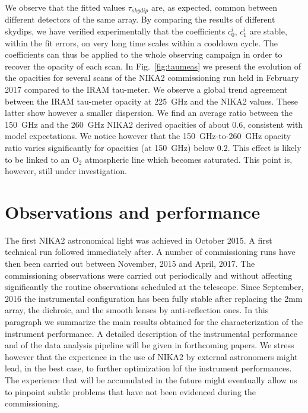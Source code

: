 \documentclass[]{aa} %
\begin{document}
We observe that the fitted values $\tau_{skydip}$ are, as expected, common between different detectors of the same array. By comparing the results of different skydips, we have verified experimentally that the coefficients $c^{i}_0$, $c^{i}_1$ are stable, within the fit errors, on very long time scales within a cooldown cycle. The coefficients can thus be applied to the whole observing campaign in order to recover the opacity of each scan. In Fig.~\ref{fig:taumeas} we present the evolution of the opacities for several scans of the NIKA2 commissioning run held in February 2017 compared to the IRAM tau-meter. We observe a global trend agreement between the IRAM tau-meter opacity at 225~GHz and the NIKA2 values. These latter show however a smaller dispersion. We find an average ratio between the 150~GHz and the 260~GHz NIKA2 derived opacities of about 0.6, consistent with model expectations. We notice however that the 150~GHz-to-260~GHz opacity ratio varies significantly for opacities (at 150~GHz) below $0.2$. This effect is likely to be linked to an O$_2$ atmospheric line which becomes saturated. This point is, however, still under investigation.

\section{Observations and performance}
\label{Observations and performance}

The first NIKA2 astronomical light was achieved in October 2015. A first technical run followed immediately after. A number of commissioning runs have then been carried out between November, 2015 and April, 2017. The commissioning observations were carried out periodically and without affecting significantly the routine observations scheduled at the telescope. Since September, 2016 the instrumental configuration has been fully stable after replacing the 2mm array, the dichroic, and the smooth lenses by anti-reflection ones.
In this paragraph we summarize the main results obtained for the characterization of the instrument performance. A detailed description of the instrumental performance and of the data analysis pipeline will be given in forthcoming papers. We stress however that the experience in the use of NIKA2 by external astronomers might lead, in the best case, to further optimization lof the instrument performances. The experience that will be accumulated in the future might eventually allow us to pinpoint subtle problems that have not been evidenced during the commissioning. 
\end{document}
